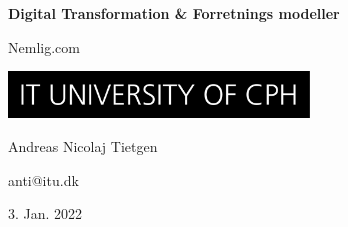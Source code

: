 \documentclass[11pt]{article}
\begin{document}
\begin{titlepage}
    \begin{center}
        \huge
        \textbf{Digital Transformation \& Forretnings modeller}

        \vspace{0.5cm}
        Nemlig.com

        \vspace{3cm}
        \includegraphics[width=0.6\textwidth]{itu.jpeg}

        \vspace{3cm}
        \large
        Andreas Nicolaj Tietgen 
        
        anti@itu.dk

        \vfill
        3. Jan. 2022
    \end{center}
\end{titlepage}

\newpage

\tableofcontents

\newpage




\newpage
\printbibliography

\newpage

\end{document}
